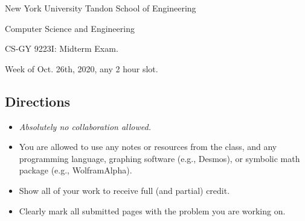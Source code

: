 \documentclass[10pt]{article}
\begin{document}
	
\begin{center}
	\normalsize
	New York University Tandon School of Engineering
	
	Computer Science and Engineering
	\medskip
	
	\large
	CS-GY 9223I: Midterm Exam. 
	
	Week of Oct. 26th, 2020, any 2 hour slot. 
	\medskip
\end{center} 

\subsection{Directions}
\begin{itemize}
	\item \emph{Absolutely no collaboration allowed.}
	\item You are allowed to use any notes or resources from the class, and any programming language, graphing software (e.g., Desmos), or symbolic math package (e.g., WolframAlpha).  
	\item Show all of your work to receive full (and partial) credit.
	\item Clearly mark all submitted pages with the problem you are working on.
\end{itemize}
\end{document}
